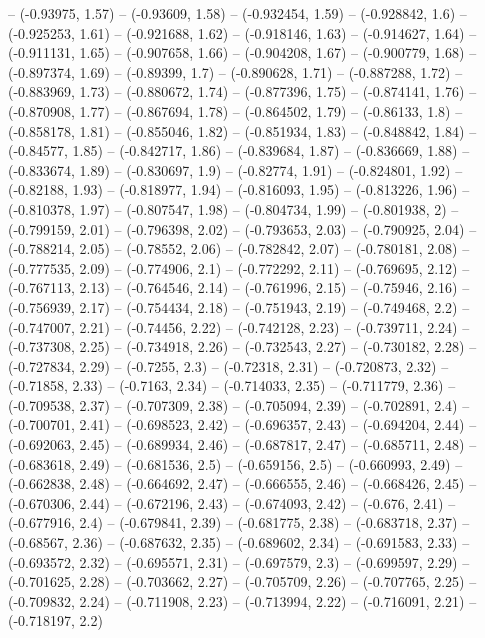 -- (-0.93975, 1.57)
-- (-0.93609, 1.58)
-- (-0.932454, 1.59)
-- (-0.928842, 1.6)
-- (-0.925253, 1.61)
-- (-0.921688, 1.62)
-- (-0.918146, 1.63)
-- (-0.914627, 1.64)
-- (-0.911131, 1.65)
-- (-0.907658, 1.66)
-- (-0.904208, 1.67)
-- (-0.900779, 1.68)
-- (-0.897374, 1.69)
-- (-0.89399, 1.7)
-- (-0.890628, 1.71)
-- (-0.887288, 1.72)
-- (-0.883969, 1.73)
-- (-0.880672, 1.74)
-- (-0.877396, 1.75)
-- (-0.874141, 1.76)
-- (-0.870908, 1.77)
-- (-0.867694, 1.78)
-- (-0.864502, 1.79)
-- (-0.86133, 1.8)
-- (-0.858178, 1.81)
-- (-0.855046, 1.82)
-- (-0.851934, 1.83)
-- (-0.848842, 1.84)
-- (-0.84577, 1.85)
-- (-0.842717, 1.86)
-- (-0.839684, 1.87)
-- (-0.836669, 1.88)
-- (-0.833674, 1.89)
-- (-0.830697, 1.9)
-- (-0.82774, 1.91)
-- (-0.824801, 1.92)
-- (-0.82188, 1.93)
-- (-0.818977, 1.94)
-- (-0.816093, 1.95)
-- (-0.813226, 1.96)
-- (-0.810378, 1.97)
-- (-0.807547, 1.98)
-- (-0.804734, 1.99)
-- (-0.801938, 2)
-- (-0.799159, 2.01)
-- (-0.796398, 2.02)
-- (-0.793653, 2.03)
-- (-0.790925, 2.04)
-- (-0.788214, 2.05)
-- (-0.78552, 2.06)
-- (-0.782842, 2.07)
-- (-0.780181, 2.08)
-- (-0.777535, 2.09)
-- (-0.774906, 2.1)
-- (-0.772292, 2.11)
-- (-0.769695, 2.12)
-- (-0.767113, 2.13)
-- (-0.764546, 2.14)
-- (-0.761996, 2.15)
-- (-0.75946, 2.16)
-- (-0.756939, 2.17)
-- (-0.754434, 2.18)
-- (-0.751943, 2.19)
-- (-0.749468, 2.2)
-- (-0.747007, 2.21)
-- (-0.74456, 2.22)
-- (-0.742128, 2.23)
-- (-0.739711, 2.24)
-- (-0.737308, 2.25)
-- (-0.734918, 2.26)
-- (-0.732543, 2.27)
-- (-0.730182, 2.28)
-- (-0.727834, 2.29)
-- (-0.7255, 2.3)
-- (-0.72318, 2.31)
-- (-0.720873, 2.32)
-- (-0.71858, 2.33)
-- (-0.7163, 2.34)
-- (-0.714033, 2.35)
-- (-0.711779, 2.36)
-- (-0.709538, 2.37)
-- (-0.707309, 2.38)
-- (-0.705094, 2.39)
-- (-0.702891, 2.4)
-- (-0.700701, 2.41)
-- (-0.698523, 2.42)
-- (-0.696357, 2.43)
-- (-0.694204, 2.44)
-- (-0.692063, 2.45)
-- (-0.689934, 2.46)
-- (-0.687817, 2.47)
-- (-0.685711, 2.48)
-- (-0.683618, 2.49)
-- (-0.681536, 2.5)
-- (-0.659156, 2.5)
-- (-0.660993, 2.49)
-- (-0.662838, 2.48)
-- (-0.664692, 2.47)
-- (-0.666555, 2.46)
-- (-0.668426, 2.45)
-- (-0.670306, 2.44)
-- (-0.672196, 2.43)
-- (-0.674093, 2.42)
-- (-0.676, 2.41)
-- (-0.677916, 2.4)
-- (-0.679841, 2.39)
-- (-0.681775, 2.38)
-- (-0.683718, 2.37)
-- (-0.68567, 2.36)
-- (-0.687632, 2.35)
-- (-0.689602, 2.34)
-- (-0.691583, 2.33)
-- (-0.693572, 2.32)
-- (-0.695571, 2.31)
-- (-0.697579, 2.3)
-- (-0.699597, 2.29)
-- (-0.701625, 2.28)
-- (-0.703662, 2.27)
-- (-0.705709, 2.26)
-- (-0.707765, 2.25)
-- (-0.709832, 2.24)
-- (-0.711908, 2.23)
-- (-0.713994, 2.22)
-- (-0.716091, 2.21)
-- (-0.718197, 2.2)

